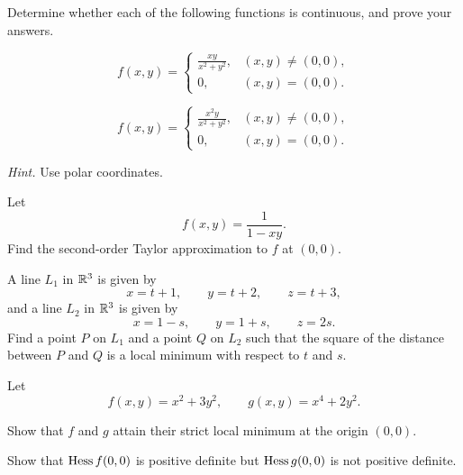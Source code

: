 \begin{problem}
Determine whether each of the following functions is continuous, and prove your answers.
\begin{problemsubparts}
\item
\[
f(x,y)=
\begin{cases}
\displaystyle\frac{xy}{x^2+y^2}, & (x,y)\ne(0,0),\\[0.55em]
0, & (x,y)=(0,0).
\end{cases}
\]
\item
\[
f(x,y)=
\begin{cases}
\displaystyle\frac{x^2y}{x^2+y^2}, & (x,y)\ne(0,0),\\[0.55em]
0, & (x,y)=(0,0).
\end{cases}
\]
\end{problemsubparts}
\noindent\textit{Hint.} Use polar coordinates.
\end{problem}

\begin{problem}
Let
\[
f(x,y)=\frac1{1-xy}.
\]
Find the second-order Taylor approximation to $f$ at $(0,0)$.
\end{problem}

\begin{problem}
A line $L_1$ in $\mathbb{R}^3$ is given by
\[
x=t+1,
\qquad y=t+2,
\qquad z=t+3,
\]
and a line $L_2$ in $\mathbb{R}^3$ is given by
\[
x=1-s,
\qquad y=1+s,
\qquad z=2s.
\]
Find a point $P$ on $L_1$ and a point $Q$ on $L_2$ such that the square of the distance between $P$ and $Q$ is a local minimum with respect to $t$ and $s$.
\end{problem}

\begin{problem}
Let
\[
f(x,y)=x^2+3y^2,
\qquad
g(x,y)=x^4+2y^2.
\]
\begin{problemsubparts}
\item Show that $f$ and $g$ attain their strict local minimum at the origin $(0,0)$.
\item Show that $\operatorname{Hess} f(0,0)$ is positive definite but $\operatorname{Hess} g(0,0)$ is not positive definite.
\end{problemsubparts}
\end{problem}


